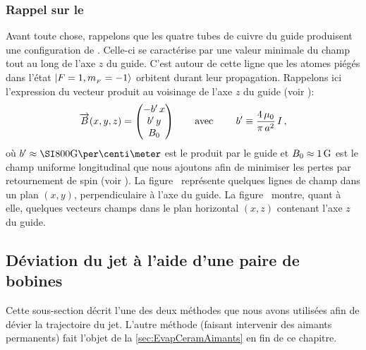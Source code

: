 \subsubsection{Rappel sur le \gm}
Avant toute chose, rappelons que les quatre tubes de cuivre du guide produisent une configuration \qp de \chm.
Celle-ci se caractérise par une valeur minimale du champ tout au long de l'axe $z$ du guide. C'est autour de cette ligne que les atomes piégés dans l'état ${{\left| { {F=1 , {m_{_F}}=-1} } \right\rangle}}$ orbitent durant leur propagation. 
Rappelons ici l'expression du vecteur \chm produit au voisinage de l'axe $z$ du guide (voir ):
\[
	{\overrightarrow{B}(x,y,z)} = \begin{pmatrix} {-{b'}\,x}\\{{b'}\,y}\\{{B_0}} \end{pmatrix} \mbox{\qquad avec \qquad} {b'} \equiv \frac{4\,\mu_0}{\pi\,a^2}\,I 
	\, ,
\]
où $\gradB\approx\gausspcm{800}$ est le \gtchm produit par le guide et ${B_0}\approx\SI{1}{{\rm G}}$ est le champ uniforme longitudinal que nous ajoutons afin de minimiser les pertes par retournement de spin (voir ).
La figure~ représente quelques lignes de champ dans un plan $(x,y)$, perpendiculaire à l'axe du guide. La figure~ montre, quant à elle, quelques vecteurs champs dans le plan horizontal $(x,z)$ contenant l'axe $z$ du guide. 
\bfigh
{}
\label{fig:GuideChampTransverse}
\efigh

\pagebreak

\subsection{Déviation du jet à l'aide d'une paire de bobines}\label{sec:EvapCeramBobines}
Cette sous-section décrit l'une des deux méthodes que nous avons utilisées afin de dévier la trajectoire du jet. L'autre méthode (faisant intervenir des aimants permanents) fait l'objet de la \autoref{sec:EvapCeramAimants} en fin de ce chapitre.

